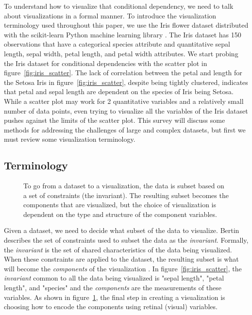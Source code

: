\documentclass[letterpaper,onecolumn,titlepage]{Ythesis}
\begin{document}
To understand how to visualize that conditional dependency, we need to talk about visualizations in a formal manner. To introduce the visualization terminology used throughout this paper, we use the Iris flower dataset \cite{fisher_use_1936-1, _uci_????} distributed with the scikit-learn Python machine learning library \cite{scikit-learn}. The Iris dataset has 150 observations that have a categorical species attribute and quantitative sepal length, sepal width, petal length, and petal width attributes. We start probing the Iris dataset for conditional dependencies with the scatter plot in figure~\ref{fig:iris_scatter}. The lack of correlation between the petal and length for the Setosa Iris in figure~\ref{fig:iris_scatter}, despite being tightly clustered, indicates that petal and sepal length are dependent on the species of Iris being Setosa. While a scatter plot may work for 2 quantitative variables and a relatively small number of data points, even trying to visualize all the variables of the Iris dataset pushes against the limits of the scatter plot. This survey will discuss some methods for addressing the challenges of large and complex datasets, but first we must review some visualization terminology. 

\subsection{Terminology}
\begin{figure}[H]

\caption{To go from a dataset to a visualization, the data is subset based on a set of constraints (the invariant). The resulting subset becomes the components that are visualized, but the choice of visualization is dependent on the type and structure of the component variables.}
\label{fig:flowchart}
\end{figure}

Given a dataset, we need to decide what subset of the data to visualize. Bertin describes the set of constraints used to subset the data as the \textit{invariant}. Formally, the \textit{invariant} is the set of shared characteristics of the data being visualized. When these constraints are applied to the dataset, the resulting subset is what will become the \textit{components} of the visualization \cite{bertin_semiology_2011}. In figure~\ref{fig:iris_scatter}, the \textit{invariant} common to all the data being visualized is "sepal length", "petal length", and "species" and the \textit{components} are the measurements of these variables. As shown in figure~\ref{fig:flowchart}, the final step in creating a visualization is choosing how to encode the
components using retinal (visual) variables.
 
\end{document}
